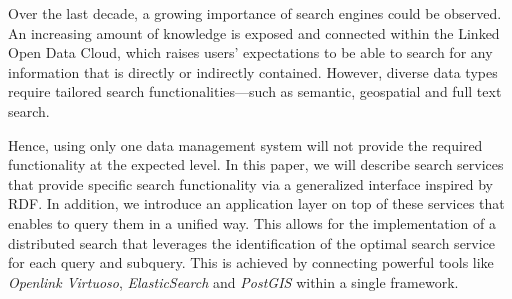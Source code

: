 
Over the last decade, a growing importance of search engines could be observed. 
An increasing amount of knowledge is exposed and connected within the Linked Open Data Cloud, which raises users' expectations to be able to search for any information that is directly or indirectly contained. 
However, diverse data types require tailored search functionalit\-ies\----such as semantic, geospatial and full text search. 

Hence, using only one data management system will not provide the required functionality at the expected level.
In this paper, we will describe search services that provide specific search functionality via a generalized interface inspired by RDF. 
In addition, we introduce an application layer on top of these services that enables to query them in a unified way. 
This allows for the implementation of a distributed search that leverages the identification of the optimal search service for each query and subquery.
This is achieved by connecting powerful tools like \textit{Openlink Virtuoso}, \textit{ElasticSearch} and \textit{PostGIS} within a single framework. 

